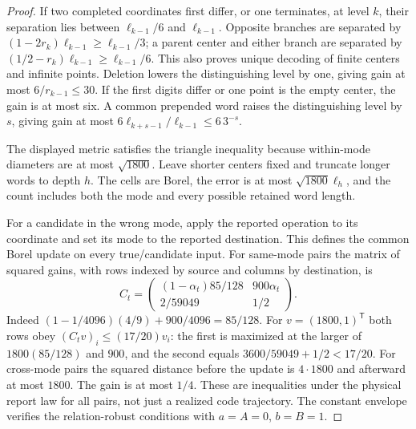 \begin{proof}
If two completed coordinates first differ, or one terminates, at level $k$, their separation lies between $\ell_{k-1}/6$ and $\ell_{k-1}$. Opposite branches are separated by $(1-2r_k)\ell_{k-1}\ge\ell_{k-1}/3$; a parent center and either branch are separated by $(1/2-r_k)\ell_{k-1}\ge\ell_{k-1}/6$. This also proves unique decoding of finite centers and infinite points. Deletion lowers the distinguishing level by one, giving gain at most $6/r_{k-1}\le30$. If the first digits differ or one point is the empty center, the gain is at most six. A common prepended word raises the distinguishing level by $s$, giving gain at most $6\ell_{k+s-1}/\ell_{k-1}\le6\,3^{-s}$.

The displayed metric satisfies the triangle inequality because within-mode diameters are at most $\sqrt{1800}$. Leave shorter centers fixed and truncate longer words to depth $h$. The cells are Borel, the error is at most $\sqrt{1800}\ell_h$, and the count includes both the mode and every possible retained word length.

For a candidate in the wrong mode, apply the reported operation to its coordinate and set its mode to the reported destination. This defines the common Borel update on every true/candidate input. For same-mode pairs the matrix of squared gains, with rows indexed by source and columns by destination, is
\[
 C_t=\begin{pmatrix}
 (1-\alpha_t)85/128&900\alpha_t\\
 2/59049&1/2
 \end{pmatrix}.
\]
Indeed $(1-1/4096)(4/9)+900/4096=85/128$. For $v=(1800,1)^{\mathsf T}$ both rows obey $(C_tv)_i\le(17/20)v_i$: the first is maximized at the larger of $1800(85/128)$ and $900$, and the second equals $3600/59049+1/2<17/20$. For cross-mode pairs the squared distance before the update is $4\cdot1800$ and afterward at most $1800$. The gain is at most $1/4$. These are inequalities under the physical report law for all pairs, not just a realized code trajectory. The constant envelope verifies the relation-robust conditions with $a=A=0$, $b=B=1$.
\end{proof}

